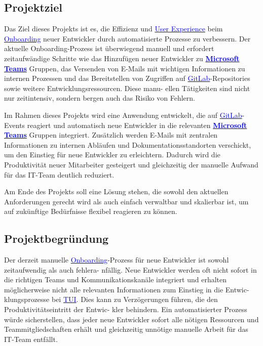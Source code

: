 \subsection{Projektziel} 
\label{sec:Projektziel}

Das Ziel dieses Projekts ist es, die Effizienz und \hyperlink{UserExperience}{\textcolor{blue}{User Experience}} beim \hyperlink{Onboarding}{\textcolor{blue}{Onboarding}} neuer Entwickler durch automatisierte Prozesse zu verbessern. Der aktuelle Onboarding-Prozess ist überwiegend manuell und erfordert zeitaufwändige Schritte wie das Hinzufügen neuer Entwickler zu \textbf{\hyperlink{MicrosoftTeams}{\textcolor{blue}{Microsoft Teams}}} Gruppen, das Versenden von E-Mails mit wichtigen Informationen zu internen Prozessen und das Bereitstellen von Zugriffen auf \hyperlink{GitLab}{\textcolor{blue}{GitLab}}-Repositories sowie weitere Entwicklungsressourcen. Diese manu-
ellen Tätigkeiten sind nicht nur zeitintensiv, sondern bergen auch das Risiko von Fehlern.

Im Rahmen dieses Projekts wird eine Anwendung entwickelt, die auf \hyperlink{GitLab}{\textcolor{blue}{GitLab}}-Events reagiert und automatisch neue Entwickler in die relevanten \textbf{\hyperlink{MicrosoftTeams}{\textcolor{blue}{Microsoft Teams}}} Gruppen integriert. Zusätzlich werden E-Mails mit zentralen Informationen zu internen Abläufen und Dokumentationsstandorten verschickt, um den Einstieg für neue Entwickler zu erleichtern. Dadurch wird die Produktivität neuer Mitarbeiter gesteigert und gleichzeitig der manuelle Aufwand für das IT-Team deutlich reduziert.

Am Ende des Projekts soll eine Lösung stehen, die sowohl den aktuellen Anforderungen gerecht wird als auch einfach verwaltbar und skalierbar ist, um auf zukünftige Bedürfnisse flexibel reagieren zu können.

\subsection{Projektbegründung} 
\label{sec:Projektbegruendung}

Der derzeit manuelle \hyperlink{Onboarding}{\textcolor{blue}{Onboarding}}-Prozess für neue Entwickler ist sowohl zeitaufwendig als auch fehlera-
nfällig. Neue Entwickler werden oft nicht sofort in die richtigen Teams und Kommunikationskanäle integriert und erhalten möglicherweise nicht alle relevanten Informationen zum Einstieg in die Entwic-
klungsprozesse bei \hyperlink{TUI}{\textcolor{blue}{TUI}}. Dies kann zu Verzögerungen führen, die den Produktivitätseintritt der Entwic-
kler behindern. Ein automatisierter Prozess würde sicherstellen, dass jeder neue Entwickler sofort alle nötigen Ressourcen und Teammitgliedschaften erhält und gleichzeitig unnötige manuelle Arbeit für das IT-Team entfällt.

